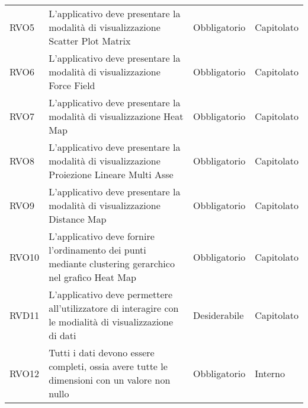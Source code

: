 \begin{longtable}[H]{>{\raggedright\arraybackslash}p{20mm} p{90mm} p{22mm} p{30mm}}
    RVO5
        & L'applicativo deve presentare la modalità di visualizzazione Scatter Plot Matrix
        & Obbligatorio
        & Capitolato \\

    RVO6
        & L'applicativo deve presentare la modalità di visualizzazione Force Field
        & Obbligatorio
        & Capitolato \\

    RVO7
        & L'applicativo deve presentare la modalità di visualizzazione Heat Map
        & Obbligatorio
        & Capitolato \\

    RVO8
        & L'applicativo deve presentare la modalità di visualizzazione Proiezione Lineare Multi Asse
        & Obbligatorio
        & Capitolato \\

    RVO9
        & L'applicativo deve presentare la modalità di visualizzazione Distance Map
        & Obbligatorio
        & Capitolato \\

    RVO10
        & L'applicativo deve fornire l'ordinamento dei punti mediante clustering gerarchico nel grafico Heat Map
        & Obbligatorio
        & Capitolato \\

    RVD11
        & L'applicativo deve permettere all'utilizzatore di interagire con le modialità di visualizzazione di dati
        & Desiderabile
        & Capitolato \\

    RVO12 &
        Tutti i dati devono essere completi, ossia avere tutte le dimensioni con un valore
        non nullo &
        Obbligatorio &
        Interno \\
\end{longtable}

